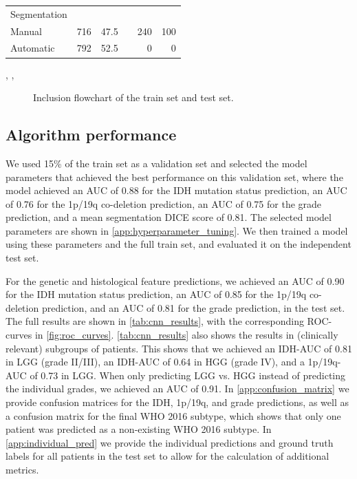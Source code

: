\begin{table}[htbp]
\begin{tabular}{l r r C{0.5cm} r r}
Segmentation\\
\hspace{1em}Manual & 716 & 47.5 && 240 & 100\\
\hspace{1em}Automatic & 792 & 52.5 && 0 & 0\\

\bottomrule
\end{tabular}

{\small \raggedright {}, ,  \par}
\end{table}

\begin{figure}
\centering
\resizebox{\textwidth}{!}{}
\caption{Inclusion flowchart of the train set and test set.}\label{fig:inclusion_flowchart}
\end{figure}

\subsection{Algorithm performance}

We used 15\% of the train set as a validation set and selected the model parameters that achieved the best performance on this validation set, where the model achieved an \gls{AUC} of 0.88 for the \gls{IDH} mutation status prediction, an \gls{AUC} of 0.76 for the 1p/19q co-deletion prediction, an \gls{AUC} of 0.75 for the grade prediction, and a mean segmentation DICE score of 0.81.
The selected model parameters are shown in \cref{app:hyperparameter_tuning}.
We then trained a model using these parameters and the full train set, and evaluated it on the independent test set.

For the genetic and histological feature predictions, we achieved an AUC of 0.90 for the \gls{IDH} mutation status prediction, an \gls{AUC} of 0.85 for the 1p/19q co-deletion prediction, and an \gls{AUC} of 0.81 for the grade prediction, in the test set.
The full results are shown in \cref{tab:cnn_results}, with the corresponding \gls{ROC}-curves in \cref{fig:roc_curves}.
\cref{tab:cnn_results} also shows the results in (clinically relevant) subgroups of patients.
This shows that we achieved an \gls{IDH}-AUC of 0.81 in \gls{LGG} (grade II/III), an \gls{IDH}-AUC of 0.64 in \gls{HGG} (grade IV), and a 1p/19q-AUC of 0.73 in \gls{LGG}.
When only predicting \gls{LGG} vs. \gls{HGG} instead of predicting the individual grades, we achieved an AUC of 0.91.
In \cref{app:confusion_matrix} we provide confusion matrices for the \gls{IDH}, 1p/19q, and grade predictions, as well as a confusion matrix for the final \gls{WHO} 2016 subtype, which shows that only one patient was predicted as a non-existing \gls{WHO} 2016 subtype.
In  \cref{app:individual_pred} we provide the individual predictions and ground truth labels for all patients in the test set to allow for the calculation of additional metrics.

